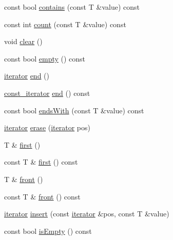 \begin{DoxyCompactItemize}
\item 
const bool \hyperlink{classprism_1_1containers_1_1_list_ab28a58bffffbc402d96fbf61d7e51ccc}{contains} (const T \&value) const 
\item 
const int \hyperlink{classprism_1_1containers_1_1_list_ae30ad8e67cef8a448894523143e932b1}{count} (const T \&value) const 
\item 
void \hyperlink{classprism_1_1containers_1_1_list_add30a4f4e839aa17e3c19e1b442eac82}{clear} ()
\item 
const bool \hyperlink{classprism_1_1containers_1_1_list_a28604c982fe03e3bb7bd50c137581d9b}{empty} () const 
\item 
\hyperlink{classprism_1_1containers_1_1_list_af3a4f72e9b96d080fe64d1803c91c7f8}{iterator} \hyperlink{classprism_1_1containers_1_1_list_a1362368fe30bae327525def3d6e06707}{end} ()
\item 
\hyperlink{classprism_1_1containers_1_1_list_ab7a3833614e0dbdcc666829f86efa5e2}{const\+\_\+iterator} \hyperlink{classprism_1_1containers_1_1_list_affdcd6a78a4a8d0f68a4e7ad56e35817}{end} () const 
\item 
const bool \hyperlink{classprism_1_1containers_1_1_list_a649a5398e9b8175d096936f0bcfbf875}{ends\+With} (const T \&value) const 
\item 
\hyperlink{classprism_1_1containers_1_1_list_af3a4f72e9b96d080fe64d1803c91c7f8}{iterator} \hyperlink{classprism_1_1containers_1_1_list_a67ecb783c3e59bd3ff2d8f316a6877b2}{erase} (\hyperlink{classprism_1_1containers_1_1_list_af3a4f72e9b96d080fe64d1803c91c7f8}{iterator} pos)
\item 
T \& \hyperlink{classprism_1_1containers_1_1_list_ae0c1ffb5c1b6a7d33fcefc308ecfc306}{first} ()
\item 
const T \& \hyperlink{classprism_1_1containers_1_1_list_a3443d1f880e9679f2f2a63e3d9762454}{first} () const 
\item 
T \& \hyperlink{classprism_1_1containers_1_1_list_a0c1937fcacc13e2646f2f359ff9839c3}{front} ()
\item 
const T \& \hyperlink{classprism_1_1containers_1_1_list_ab4544a4c38e8cc74a9c6c1164a1a32ad}{front} () const 
\item 
\hyperlink{classprism_1_1containers_1_1_list_af3a4f72e9b96d080fe64d1803c91c7f8}{iterator} \hyperlink{classprism_1_1containers_1_1_list_a0ff4c21815c2a490bfe845a1755a662d}{insert} (const \hyperlink{classprism_1_1containers_1_1_list_af3a4f72e9b96d080fe64d1803c91c7f8}{iterator} \&pos, const T \&value)
\item 
const bool \hyperlink{classprism_1_1containers_1_1_list_ac96aee1235d2fdfbf1582fd5bc63c410}{is\+Empty} () const 

\end{DoxyCompactItemize}
